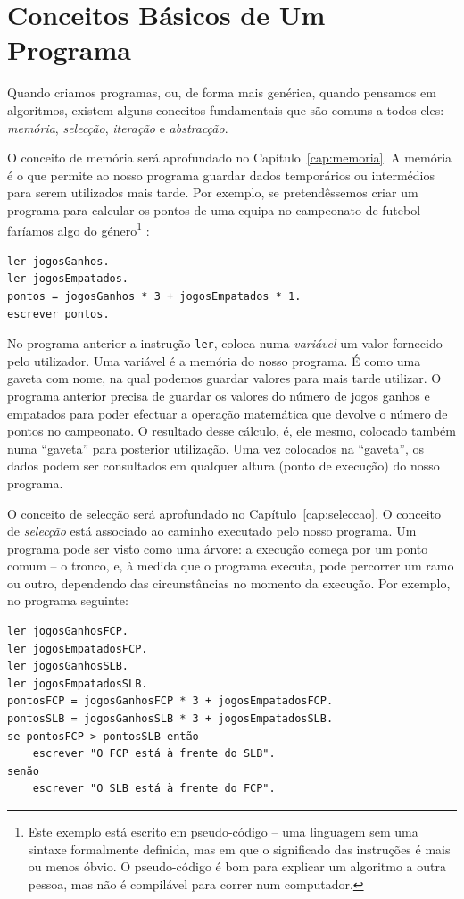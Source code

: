 \section{Conceitos Básicos de Um Programa}
Quando criamos programas, ou, de forma mais genérica, quando pensamos em algoritmos, existem alguns conceitos fundamentais que são comuns a todos eles: \emph{memória}, \emph{selecção}, \emph{iteração} e \emph{abstracção}.

\begin{description} \itemsep5pt %
\item[Memória]O conceito de memória será aprofundado no Capítulo~\ref{cap:memoria}.
A memória é o que permite ao nosso programa guardar dados temporários ou intermédios para serem utilizados mais tarde.
Por exemplo, se pretendêssemos criar um programa para calcular os pontos de uma equipa no campeonato de futebol faríamos algo do género\footnote{
Este exemplo está escrito em pseudo-código -- uma linguagem sem uma sintaxe formalmente definida, mas em que o significado das instruções é mais ou menos óbvio. O pseudo-código é bom para explicar um algoritmo a outra pessoa, mas não é compilável para correr num computador.
}%
:
\begin{lstlisting}
ler jogosGanhos.
ler jogosEmpatados.
pontos = jogosGanhos * 3 + jogosEmpatados * 1.
escrever pontos.
\end{lstlisting}
No programa anterior a instrução \texttt{ler}, coloca numa \emph{variável} um valor fornecido pelo utilizador. Uma variável
é a memória do nosso programa. É como uma gaveta com nome, na qual podemos guardar valores para mais tarde utilizar.
O programa anterior precisa de guardar os valores do número de jogos ganhos e empatados para poder efectuar a operação matemática que devolve o número de pontos no campeonato. O resultado desse cálculo, é, ele mesmo, colocado também numa ``gaveta'' para posterior utilização. Uma vez colocados na ``gaveta'', os dados podem ser consultados em qualquer altura (ponto de execução) do nosso programa. 


\item[Selecção] O conceito de selecção será aprofundado no Capítulo~\ref{cap:seleccao}.
O conceito de \emph{selecção} está associado ao caminho executado pelo nosso programa. Um programa pode ser visto como uma árvore: a execução começa por um ponto comum -- o tronco, e, à medida que o programa executa, pode percorrer um ramo ou outro, dependendo das circunstâncias no momento da execução.
Por exemplo, no programa seguinte:
\begin{lstlisting}
ler jogosGanhosFCP.
ler jogosEmpatadosFCP.
ler jogosGanhosSLB.
ler jogosEmpatadosSLB.
pontosFCP = jogosGanhosFCP * 3 + jogosEmpatadosFCP.
pontosSLB = jogosGanhosSLB * 3 + jogosEmpatadosSLB.
se pontosFCP > pontosSLB então 
	escrever "O FCP está à frente do SLB".
senão
	escrever "O SLB está à frente do FCP".     
\end{lstlisting}


\end{description}
